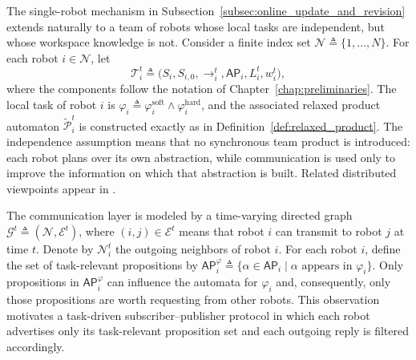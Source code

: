 The single-robot mechanism in
Subsection~\ref{subsec:online_update_and_revision} extends naturally to a team
of robots whose local tasks are independent, but whose workspace knowledge is
not. Consider a finite index set
$\mathcal{N} \triangleq \{1,\ldots,N\}$. For each robot $i \in \mathcal{N}$,
let
\begin{equation}
\mathcal{T}_{i}^{t} \triangleq
\bigl(S_{i},S_{i,0},\rightarrow_{i}^{t},\mathsf{AP}_{i},L_{i}^{t},w_{i}^{t}
\bigr),
\label{eq:local_team_ts}
\end{equation}
where the components follow the notation of
Chapter~\ref{chap:preliminaries}. The local task of robot $i$ is
$\varphi_{i} \triangleq
\varphi_{i}^{\mathrm{soft}} \wedge \varphi_{i}^{\mathrm{hard}}$, and the
associated relaxed product automaton
$\widetilde{\mathcal{P}}_{i}^{t}$ is constructed exactly as in
Definition~\ref{def:relaxed_product}. The independence assumption means that
no synchronous team product is introduced: each robot plans over its own
abstraction, while communication is used only to improve the information on
which that abstraction is built. Related distributed viewpoints appear in
\cite{durfee2006distributed,filippidis2012decentralized,guo2014distributed}.

The communication layer is modeled by a time-varying directed graph
$\mathcal{G}^{t} \triangleq (\mathcal{N},\mathcal{E}^{t})$, where
$(i,j) \in \mathcal{E}^{t}$ means that robot $i$ can transmit to robot $j$ at
time $t$. Denote by $\mathcal{N}_{i}^{t}$ the outgoing neighbors of robot $i$.
For each robot $i$, define the set of task-relevant propositions by
$\mathsf{AP}_{i}^{\varphi} \triangleq
\{\alpha \in \mathsf{AP}_{i} \mid \alpha \text{ appears in } \varphi_{i}\}$.
Only propositions in $\mathsf{AP}_{i}^{\varphi}$ can influence the automata
for $\varphi_{i}$ and, consequently, only those propositions are worth
requesting from other robots. This observation motivates a task-driven
subscriber--publisher protocol in which each robot advertises only its
task-relevant proposition set and each outgoing reply is filtered accordingly.

